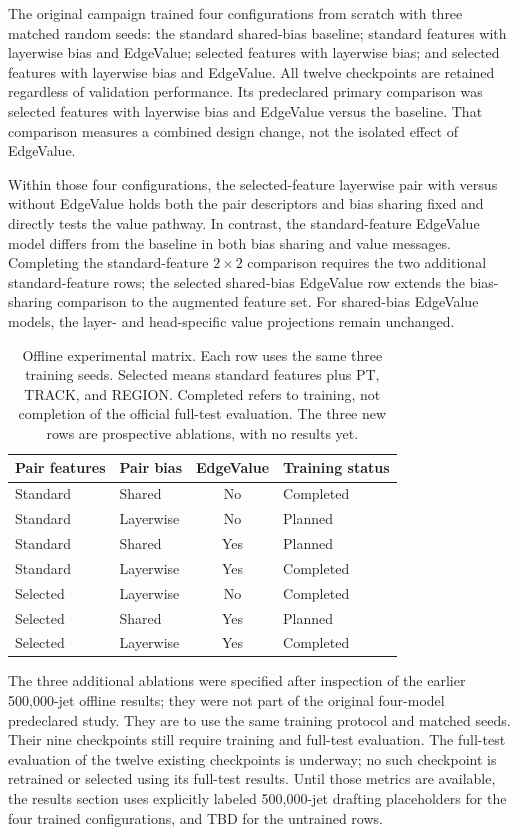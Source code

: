 The original campaign trained four configurations from scratch with three
matched random seeds: the standard shared-bias baseline; standard features
with layerwise bias and EdgeValue; selected features with layerwise bias;
and selected features with layerwise bias and EdgeValue. All twelve
checkpoints are retained regardless of validation performance. Its
predeclared primary comparison was selected features with layerwise bias
and EdgeValue versus the baseline. That comparison measures a combined
design change, not the isolated effect of EdgeValue.

Within those four configurations, the selected-feature layerwise pair
with versus without EdgeValue holds both the pair descriptors and bias
sharing fixed and directly tests the value pathway. In contrast, the
standard-feature EdgeValue model differs from the baseline in both bias
sharing and value messages. Completing the standard-feature
$2\times2$ comparison requires the two additional standard-feature rows;
the selected shared-bias EdgeValue row extends the bias-sharing comparison
to the augmented feature set. For shared-bias EdgeValue models, the
layer- and head-specific value projections remain unchanged.

\begin{table}[htbp]
\centering
\small
\begin{tabular}{@{}llcl@{}}
\toprule
Pair features & Pair bias & EdgeValue & Training status \\
\midrule
Standard & Shared & No & Completed \\
Standard & Layerwise & No & Planned \\
Standard & Shared & Yes & Planned \\
Standard & Layerwise & Yes & Completed \\
Selected & Layerwise & No & Completed \\
Selected & Shared & Yes & Planned \\
Selected & Layerwise & Yes & Completed \\
\bottomrule
\end{tabular}
\caption{Offline experimental matrix. Each row uses the same three training seeds.
Selected means standard features plus PT, TRACK, and REGION. Completed
refers to training, not completion of the official full-test evaluation.
The three new rows are prospective ablations, with no results yet.}
\label{tab:offline-design}
\end{table}

The three additional ablations were specified after inspection of the
earlier 500,000-jet offline results; they were not part of the original
four-model predeclared study. They are to use the same training protocol
and matched seeds. Their nine checkpoints still require training and
full-test evaluation. The full-test evaluation of the twelve existing
checkpoints is underway; no such checkpoint is retrained or selected using
its full-test results. Until those metrics are available, the results
section uses explicitly labeled 500,000-jet drafting placeholders for the
four trained configurations, and TBD for the untrained rows.

